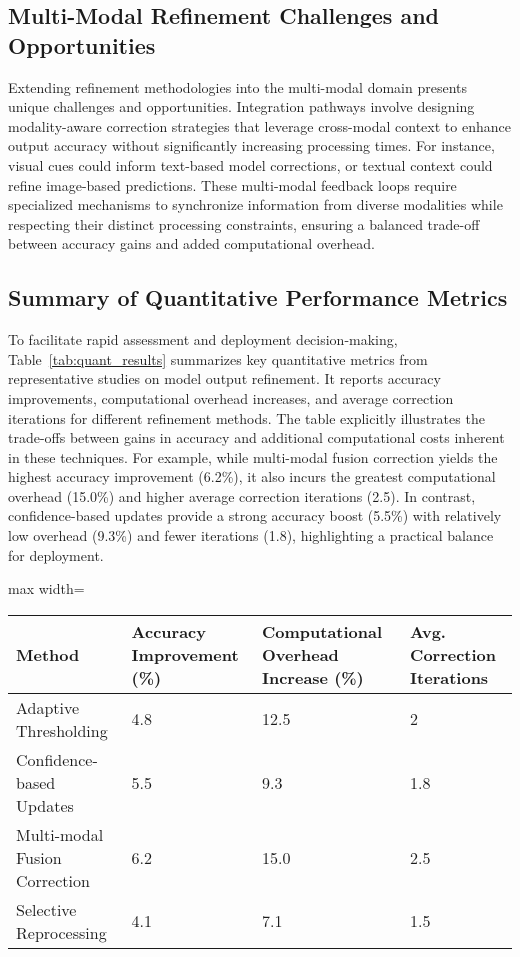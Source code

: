 \documentclass[sigconf]{acmart}
\begin{document}
\subsection{Multi-Modal Refinement Challenges and Opportunities}
Extending refinement methodologies into the multi-modal domain presents unique challenges and opportunities. Integration pathways involve designing modality-aware correction strategies that leverage cross-modal context to enhance output accuracy without significantly increasing processing times. For instance, visual cues could inform text-based model corrections, or textual context could refine image-based predictions. These multi-modal feedback loops require specialized mechanisms to synchronize information from diverse modalities while respecting their distinct processing constraints, ensuring a balanced trade-off between accuracy gains and added computational overhead.

\subsection{Summary of Quantitative Performance Metrics}
To facilitate rapid assessment and deployment decision-making, Table~\ref{tab:quant_results} summarizes key quantitative metrics from representative studies on model output refinement. It reports accuracy improvements, computational overhead increases, and average correction iterations for different refinement methods. The table explicitly illustrates the trade-offs between gains in accuracy and additional computational costs inherent in these techniques. For example, while multi-modal fusion correction yields the highest accuracy improvement (6.2\%), it also incurs the greatest computational overhead (15.0\%) and higher average correction iterations (2.5). In contrast, confidence-based updates provide a strong accuracy boost (5.5\%) with relatively low overhead (9.3\%) and fewer iterations (1.8), highlighting a practical balance for deployment.

\begin{table*}[htbp]
\centering
\caption{Summary of Key Quantitative Results on Model Output Refinement Efficiency and Performance}
\label{tab:quant_results}
\begin{adjustbox}{max width=\textwidth}
\begin{tabular}{@{}llll@{}}
\toprule
\textbf{Method} & \textbf{Accuracy Improvement (\%)} & \textbf{Computational Overhead Increase (\%)} & \textbf{Avg. Correction Iterations} \\ \midrule
Adaptive Thresholding & 4.8 & 12.5 & 2 \\
Confidence-based Updates & 5.5 & 9.3 & 1.8 \\
Multi-modal Fusion Correction & 6.2 & 15.0 & 2.5 \\
Selective Reprocessing & 4.1 & 7.1 & 1.5 \\ \bottomrule
\end{tabular}
\end{adjustbox}
\end{table*}
\end{document}
